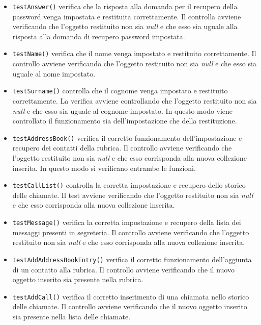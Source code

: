 \begin{itemize}
\begin{itemize}
\item \texttt{testAnswer()} verifica che la risposta alla domanda per il recupero della password venga impostata e restituita correttamente. Il controlla avviene verificando che l'oggetto restituito non sia \textit{null} e che esso sia uguale alla risposta alla domanda di recupero password impostata. 

\item \texttt{testName()} verifica che il nome venga impostato e restituito correttamente. Il controllo avviene verificando che l'oggetto restituito non sia \textit{null} e che esso sia uguale al nome impostato.

\item \texttt{testSurname()} controlla che il cognome venga impostato e restituito correttamente. La verifica avviene controllando che l'oggetto restituito non sia \textit{null} e che esso sia uguale al cognome impostato. In questo modo viene controllato il funzionamento sia dell'impostazione che della restituzione.

\item \texttt{testAddressBook()} verifica il corretto funzionamento dell'impostazione e recupero dei contatti della rubrica.
Il controllo avviene verificando che l'oggetto restituito non sia \textit{null} e che esso corrisponda alla nuova collezione inserita.
In questo modo si verificano entrambe le funzioni.

\item \texttt{testCallList()} controlla la corretta impostazione e recupero dello storico delle chiamate.
Il test avviene verificando che l'oggetto restituito non sia \textit{null} e che esso corrisponda alla nuova collezione inserita.

\item \texttt{testMessage()} verifica la corretta impostazione e recupero della lista dei messaggi presenti in segreteria.
Il controllo avviene verificando che l'oggetto restituito non sia \textit{null} e che esso corrisponda alla nuova collezione inserita.

\item \texttt{testAddAddressBookEntry()} verifica il corretto funzionamento dell'aggiunta di un contatto alla rubrica.
Il controllo avviene verificando che il nuovo oggetto inserito sia presente nella rubrica.

\item \texttt{testAddCall()} verifica il corretto inserimento di una chiamata nello storico delle chiamate.
Il controllo avviene verificando che il nuovo oggetto inserito sia presente nella lista delle chiamate. 


\end{itemize}
\end{itemize}
